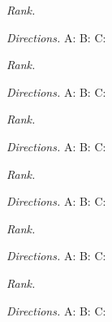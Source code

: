 \documentclass[]{exam}
\begin{document}
\begin{questions}
\begin{multicols}{2}

\question \label{Zo6wp}
\textit{Rank.}\quad \fillin[C, B, A][4cm]

\textit{Directions.} A: \fillin[$\rightarrow$][2em]\quad 
B: \fillin[$\rightarrow$][2em]\quad
C: \fillin[$\rightarrow$][2em]
\smallskip



\question
\textit{Rank.}\quad \fillin[B, C, A][4cm]

\textit{Directions.} A: \fillin[$\rightarrow$][2em]\quad 
B: \fillin[$\leftarrow$][2em]\quad
C: \fillin[$\rightarrow$][2em]
\smallskip




\question
\textit{Rank.}\quad \fillin[C, A, B][4cm]

\textit{Directions.} A: \fillin[$\leftarrow$][2em]\quad 
B: \fillin[$\leftarrow$][2em]\quad
C: \fillin[$\leftarrow$][2em]
\smallskip



\vspace*{\fill}
\columnbreak


\question
\textit{Rank.}\quad \fillin[C, A, B][4cm]

\textit{Directions.} A: \fillin[$\rightarrow$][2em]\quad 
B: \fillin[$\rightarrow$][2em]\quad
C: \fillin[$\rightarrow$][2em]
\smallskip



\question
\textit{Rank.}\quad \fillin[C, B, A][4cm]

\textit{Directions.} A: \fillin[$\leftarrow$][2em]\quad 
B: \fillin[$\leftarrow$][2em]\quad
C: \fillin[$\leftarrow$][2em]
\smallskip



\question \label{Wi6U8}
\textit{Rank.}\quad \fillin[A, B, C][4cm]

\textit{Directions.} A: \fillin[$\rightarrow$][2em]\quad 
B: \fillin[$\rightarrow$][2em]\quad
C: \fillin[$\rightarrow$][2em]
\smallskip





\end{multicols}
\end{questions}
\end{document}
